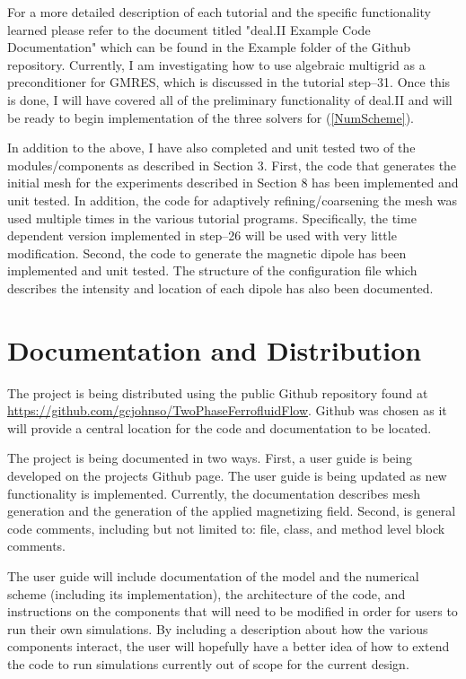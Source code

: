 \documentclass[11pt,fullpage]{article}
\theoremstyle{lemma}
\theoremstyle{definition}
\theoremstyle{lemma}
\begin{document}
For a more detailed description of each tutorial and the specific functionality learned please refer to the document titled "deal.II Example Code Documentation" which can be found in the Example folder of the Github repository. Currently, I am investigating how to use algebraic multigrid as a preconditioner for GMRES, which is discussed in the tutorial step--31. Once this is done, I will have covered all of the preliminary functionality of deal.II and will be ready to begin implementation of the three solvers for (\ref{NumScheme}).

In addition to the above, I have also completed and unit tested two of the modules/components as described in Section 3. First, the code that generates the initial mesh for the experiments described in Section 8 has been implemented and unit tested. In addition, the code for adaptively refining/coarsening the mesh was used multiple times in the various tutorial programs. Specifically, the time dependent version implemented in step--26 will be used with very little modification. Second, the code to generate the magnetic dipole has been implemented and unit tested. The structure of the configuration file which describes the intensity and location of each dipole has also been documented.

\section{Documentation and Distribution}
The project is being distributed using the public Github repository found at \url{https://github.com/gcjohnso/TwoPhaseFerrofluidFlow}. Github was chosen as it will provide a central location for the code and documentation to be located.

The project is being documented in two ways. First, a user guide is being developed on the projects Github page. The user guide is being updated as new functionality is implemented. Currently, the documentation describes mesh generation and the generation of the applied magnetizing field. Second, is general code comments, including but not limited to: file, class, and method level block comments. 

The user guide will include documentation of the model and the numerical scheme (including its implementation), the architecture of the code, and instructions on the components that will need to be modified in order for users to run their own simulations. By including a description about how the various components interact, the user will hopefully have a better idea of how to extend the code to run simulations currently out of scope for the current design.
\end{document}
